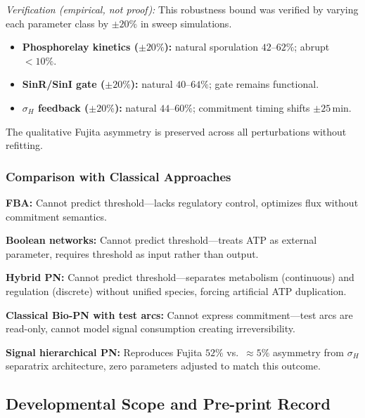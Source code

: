 \documentclass[10pt,letterpaper]{article}
\begin{document}
\noindent\textit{Verification (empirical, not proof):} This robustness bound was verified by varying each parameter class by $\pm20\%$ in sweep simulations.
\begin{itemize}
\item \textbf{Phosphorelay kinetics ($\pm20\%$):} natural sporulation $42\text{--}62\%$; abrupt $< 10\%$.
\item \textbf{SinR/SinI gate ($\pm20\%$):} natural $40\text{--}64\%$; gate remains functional.
\item \textbf{$\sigma_H$ feedback ($\pm20\%$):} natural $44\text{--}60\%$; commitment timing shifts $\pm 25\,$min.
\end{itemize}
The qualitative Fujita asymmetry is preserved across all perturbations without refitting.

\subsubsection{Comparison with Classical Approaches}

\textbf{FBA:} Cannot predict threshold---lacks regulatory control, optimizes flux without commitment semantics.

\textbf{Boolean networks:} Cannot predict threshold---treats ATP as external parameter, requires threshold as input rather than output.

\textbf{Hybrid PN:} Cannot predict threshold---separates metabolism (continuous) and regulation (discrete) without unified species, forcing artificial ATP duplication.

\textbf{Classical Bio-PN with test arcs:} Cannot express commitment---test arcs are read-only, cannot model signal consumption creating irreversibility.

\textbf{Signal hierarchical PN:} Reproduces Fujita $52\%$ vs.\ $\approx 5\%$ asymmetry from $\sigma_H$ separatrix architecture, zero parameters adjusted to match this outcome.

\subsection{Developmental Scope and Pre-print Record}
\label{sec:broader}
\end{document}
